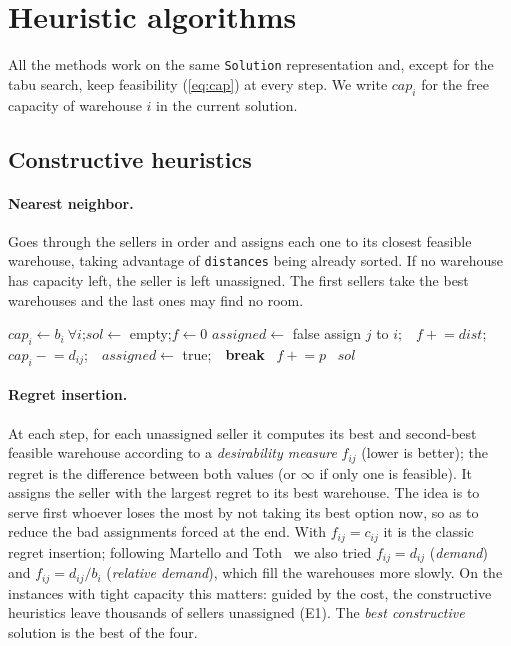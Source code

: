 \documentclass[11pt,a4paper]{article}
\newcommand{\code}[1]{\texttt{#1}}
\begin{document}
\section{Heuristic algorithms}
All the methods work on the same \code{Solution} representation and, except for the tabu search,
keep feasibility (\eqref{eq:cap}) at every step. We write $cap_i$ for the free capacity of
warehouse $i$ in the current solution.

\subsection{Constructive heuristics}
\paragraph{Nearest neighbor.} Goes through the sellers in order and assigns each one to its
closest feasible warehouse, taking advantage of \code{distances} being already sorted. If no
warehouse has capacity left, the seller is left unassigned. The first sellers take the best
warehouses and the last ones may find no room.

\begin{algorithm}[H]
\caption{Constructive heuristic: nearest neighbor}
\begin{algorithmic}[1]
  \State $cap_i \gets b_i\ \forall i$;\quad $sol \gets$ empty;\quad $f \gets 0$
    \State $assigned \gets$ false
        \State assign $j$ to $i$;\ \ $f \mathrel{+}= dist$;\ \ $cap_i \mathrel{-}= d_{ij}$;\ \ $assigned\gets$ true;\ \ \textbf{break}
      \EndIf
    \EndFor
    \ $f \mathrel{+}= p$\ \EndIf
  \EndFor
  \State \Return $sol$
\EndFunction
\end{algorithmic}
\end{algorithm}

\paragraph{Regret insertion.} At each step, for each unassigned seller it computes its best and
second-best feasible warehouse according to a \emph{desirability measure} $f_{ij}$ (lower is
better); the regret is the difference between both values (or $\infty$ if only one is feasible).
It assigns the seller with the largest regret to its best warehouse. The idea is to serve first
whoever loses the most by not taking its best option now, so as to reduce the bad assignments
forced at the end. With $f_{ij}=c_{ij}$ it is the classic regret insertion; following Martello and
Toth~\cite{martello1981} we also tried $f_{ij}=d_{ij}$ (\emph{demand}) and $f_{ij}=d_{ij}/b_i$
(\emph{relative demand}), which fill the warehouses more slowly. On the instances with tight
capacity this matters: guided by the cost, the constructive heuristics leave thousands of sellers
unassigned (E1). The \emph{best constructive} solution is the best of the four.
\end{document}
